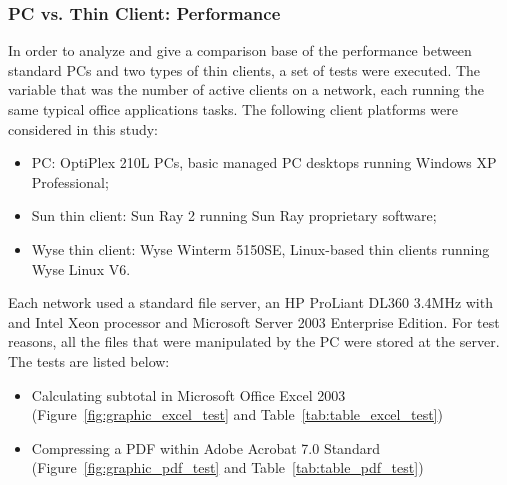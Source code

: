             \subsubsection*{PC vs. Thin Client: Performance}
                In order to analyze and give a comparison base of the performance between standard PCs and two types of thin clients, a set of tests were executed. The variable that was the number of active clients on a network, each running the same typical office applications tasks. The following client platforms were considered in this study:
                \begin{itemize}
                    \item PC: OptiPlex 210L PCs, basic managed PC desktops running Windows XP Professional;
                    \item Sun thin client: Sun Ray 2 running Sun Ray proprietary software;
                    \item Wyse thin client: Wyse Winterm 5150SE, Linux-based thin clients running Wyse Linux V6.
                \end{itemize}
                Each network used a standard file server, an HP ProLiant DL360 3.4MHz with and Intel Xeon processor and Microsoft Server 2003 Enterprise Edition. For test reasons, all the files that were manipulated by the PC were stored at the server. The tests are listed below:
                \begin{itemize}
                    \item Calculating subtotal in Microsoft Office Excel 2003 (Figure~\ref{fig:graphic_excel_test} and Table~\ref{tab:table_excel_test})
                    \item Compressing a PDF within Adobe Acrobat 7.0 Standard (Figure~\ref{fig:graphic_pdf_test} and Table~\ref{tab:table_pdf_test})
                \end{itemize}
                
